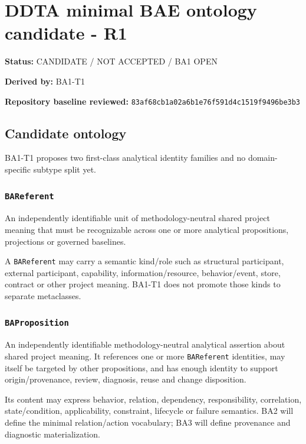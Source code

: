 \documentclass[
]{article}
\author{}
\date{}
\begin{document}
\section{DDTA minimal BAE ontology candidate -
R1}\label{ddta-minimal-bae-ontology-candidate---r1}

\textbf{Status:} CANDIDATE / NOT ACCEPTED / BA1 OPEN

\textbf{Derived by:} BA1-T1

\textbf{Repository baseline reviewed:}
\texttt{83af68cb1a02a6b1e76f591d4c1519f9496be3b3}

\subsection{Candidate ontology}\label{candidate-ontology}

BA1-T1 proposes two first-class analytical identity families and no
domain-specific subtype split yet.

\subsubsection{\texorpdfstring{\texttt{BAReferent}}{BAReferent}}\label{bareferent}

An independently identifiable unit of methodology-neutral shared project
meaning that must be recognizable across one or more analytical
propositions, projections or governed baselines.

A \texttt{BAReferent} may carry a semantic kind/role such as structural
participant, external participant, capability, information/resource,
behavior/event, store, contract or other project meaning. BA1-T1 does
not promote those kinds to separate metaclasses.

\subsubsection{\texorpdfstring{\texttt{BAProposition}}{BAProposition}}\label{baproposition}

An independently identifiable methodology-neutral analytical assertion
about shared project meaning. It references one or more
\texttt{BAReferent} identities, may itself be targeted by other
propositions, and has enough identity to support origin/provenance,
review, diagnosis, reuse and change disposition.

Its content may express behavior, relation, dependency, responsibility,
correlation, state/condition, applicability, constraint, lifecycle or
failure semantics. BA2 will define the minimal relation/action
vocabulary; BA3 will define provenance and diagnostic materialization.
\end{document}
